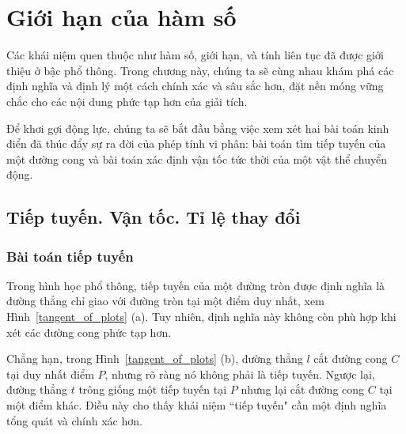 \section{Giới hạn của hàm số}

Các khái niệm quen thuộc như hàm số, giới hạn, và tính liên tục đã được giới thiệu ở bậc phổ thông. Trong chương này, chúng ta sẽ cùng nhau khám phá các định nghĩa và định lý một cách chính xác và sâu sắc hơn, đặt nền móng vững chắc cho các nội dung phức tạp hơn của giải tích.

Để khơi gợi động lực, chúng ta sẽ bắt đầu bằng việc xem xét hai bài toán kinh điển đã thúc đẩy sự ra đời của phép tính vi phân: bài toán tìm tiếp tuyến của một đường cong và bài toán xác định vận tốc tức thời của một vật thể chuyển động.

\subsection{Tiếp tuyến. Vận tốc. Tỉ lệ thay đổi}
\label{subsec:tiep-tuyen-van-toc}

\subsubsection{Bài toán tiếp tuyến}

Trong hình học phổ thông, tiếp tuyến của một đường tròn được định nghĩa là đường thẳng chỉ giao với đường tròn tại một điểm duy nhất, xem Hình~\ref{tangent_of_plots} (a). Tuy nhiên, định nghĩa này không còn phù hợp khi xét các đường cong phức tạp hơn.

Chẳng hạn, trong Hình~\ref{tangent_of_plots} (b), đường thẳng $l$ cắt đường cong $C$ tại duy nhất điểm $P$, nhưng rõ ràng nó không phải là tiếp tuyến. Ngược lại, đường thẳng $t$ trông giống một tiếp tuyến tại $P$ nhưng lại cắt đường cong $C$ tại một điểm khác. Điều này cho thấy khái niệm ``tiếp tuyến" cần một định nghĩa tổng quát và chính xác hơn.

